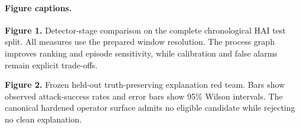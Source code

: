 \paragraph{Figure captions.}
\textbf{Figure 1.} Detector-stage comparison on the complete chronological HAI test split.
All measures use the prepared window resolution. The process graph improves ranking and
episode sensitivity, while calibration and false alarms remain explicit trade-offs.

\textbf{Figure 2.} Frozen held-out truth-preserving explanation red team. Bars show observed
attack-success rates and error bars show 95\% Wilson intervals. The canonical hardened
operator surface admits no eligible candidate while rejecting no clean explanation.
